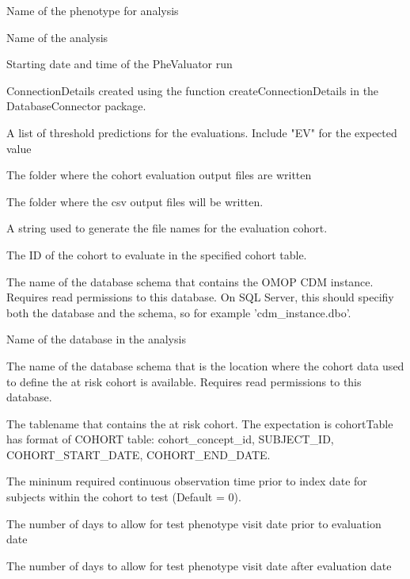 \documentclass[a4paper]{book}
\begin{document}
\begin{Arguments}
\begin{ldescription}
\item[\code{phenotype}] Name of the phenotype for analysis

\item[\code{analysisName}] Name of the analysis

\item[\code{runDateTime}] Starting date and time of the PheValuator run

\item[\code{connectionDetails}] ConnectionDetails created using the function
createConnectionDetails in the DatabaseConnector package.

\item[\code{cutPoints}] A list of threshold predictions for the evaluations.  Include "EV"
for the expected value

\item[\code{outFolder}] The folder where the cohort evaluation output files are written

\item[\code{exportFolder}] The folder where the csv output files will be written.

\item[\code{evaluationCohortId}] A string used to generate the file names for the evaluation cohort.

\item[\code{phenotypeCohortId}] The ID of the cohort to evaluate in the specified cohort table.

\item[\code{cdmDatabaseSchema}] The name of the database schema that contains the OMOP CDM
instance. Requires read permissions to this database. On SQL
Server, this should specifiy both the database and the
schema, so for example 'cdm\_instance.dbo'.

\item[\code{databaseId}] Name of the database in the analysis

\item[\code{cohortDatabaseSchema}] The name of the database schema that is the location where the
cohort data used to define the at risk cohort is available.
Requires read permissions to this database.

\item[\code{cohortTable}] The tablename that contains the at risk cohort. The expectation is
cohortTable has format of COHORT table: cohort\_concept\_id,
SUBJECT\_ID, COHORT\_START\_DATE, COHORT\_END\_DATE.

\item[\code{washoutPeriod}] The mininum required continuous observation time prior to index
date for subjects within the cohort to test (Default = 0).

\item[\code{splayPrior}] The number of days to allow for test phenotype visit date prior to evaluation date

\item[\code{splayPost}] The number of days to allow for test phenotype visit date after evaluation date
\end{ldescription}
\end{Arguments}
\end{document}
